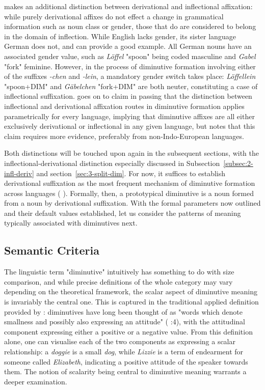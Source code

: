 \citeauthor{Schneider+2003} makes an additional distinction between derivational and inflectional affixation: while purely derivational affixes do not effect a change in grammatical information such as noun class or gender, those that do are considered to belong in the domain of inflection. While English lacks gender, its sister language German does not, and can provide a good example. All German nouns have an associated gender value, such as \textit{Löffel} "spoon" being coded masculine and \textit{Gabel} "fork" feminine. However, in the process of diminutive formation involving either of the suffixes \textit{-chen} and \textit{-lein}, a mandatory gender switch takes place: \textit{Löffellein} "spoon+DIM" and \textit{Gäbelchen} "fork+DIM" are both neuter, constituting a case of inflectional suffixation. \citeauthor{Schneider+2003} goes on to claim in passing that the distinction between inflectional and derivational affixation routes in diminutive formation applies parametrically for every language, implying that diminutive affixes are all either exclusively derivational or inflectional in any given language, but notes that this claim requires more evidence, preferably from non-Indo-European languages.

Both distinctions will be touched upon again in the subsequent sections, with the inflectional-derivational distinction especially discussed in Subsection~\ref{subsec:2-infl-deriv} and section~\ref{sec:3-split-dim}. For now, it suffices to establish derivational suffixation as the most frequent mechanism of diminutive formation across languages (\citeauthor{Schneider+2003} \citeyear{Schneider+2003}). Formally, then, a prototypical diminutive is a noun formed from a noun by derivational suffixation. With the formal parameters now outlined and their default values established, let us consider the patterns of meaning typically associated with diminutives next.

\subsection{Semantic Criteria}
\label{subsec:2-semantic-crit}
The linguistic term "diminutive" intuitively has something to do with size comparison, and while precise definitions of the whole category may vary depending on the theoretical framework, the scalar aspect of diminutive meaning is invariably the central one. This is captured in the traditional applied definition provided by \citeauthor{Schneider+2003}: diminutives have long been thought of as "words which denote smallness and possibly also expressing an attitude" (\citeauthor{Schneider+2003} \citeyear{Schneider+2003}:4), with the attitudinal component expressing either a positive or a negative value. From this definition alone, one can visualise each of the two components as expressing a scalar relationship: a \textit{doggie} is a small \textit{dog}, while \textit{Lizzie} is a term of endearment for someone called \textit{Elizabeth}, indicating a positive attitude of the speaker towards them. The notion of scalarity being central to diminutive meaning warrants a deeper examination.

